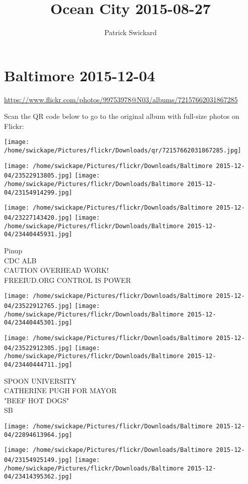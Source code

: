 \documentclass[10pt,letterpaper]{article}
\title{Ocean City 2015-08-27}
\author{Patrick Swickard}
\date{}
\begin{document}
\section*{Baltimore 2015-12-04}

\url{https://www.flickr.com/photos/99753978@N03/albums/72157662031867285}

Scan the QR code below to go to the original album with full-size photos on Flickr:

\texttt{[image: /home/swickape/Pictures/flickr/Downloads/qr/72157662031867285.jpg]}
\pagebreak

\texttt{[image: /home/swickape/Pictures/flickr/Downloads/Baltimore 2015-12-04/23522913805.jpg]}
\texttt{[image: /home/swickape/Pictures/flickr/Downloads/Baltimore 2015-12-04/23154914299.jpg]}

\texttt{[image: /home/swickape/Pictures/flickr/Downloads/Baltimore 2015-12-04/23227143420.jpg]}
\texttt{[image: /home/swickape/Pictures/flickr/Downloads/Baltimore 2015-12-04/23440445931.jpg]}

Pinup\\
CDC ALB\\
CAUTION OVERHEAD WORK!\\
FREEIUD.ORG CONTROL IS POWER
\pagebreak

\texttt{[image: /home/swickape/Pictures/flickr/Downloads/Baltimore 2015-12-04/23522912765.jpg]}
\texttt{[image: /home/swickape/Pictures/flickr/Downloads/Baltimore 2015-12-04/23440445301.jpg]}

\texttt{[image: /home/swickape/Pictures/flickr/Downloads/Baltimore 2015-12-04/23522912305.jpg]}
\texttt{[image: /home/swickape/Pictures/flickr/Downloads/Baltimore 2015-12-04/23440444711.jpg]}

SPOON UNIVERSITY\\
CATHERINE PUGH FOR MAYOR\\
"BEEF HOT DOGS"\\
SB
\pagebreak

\texttt{[image: /home/swickape/Pictures/flickr/Downloads/Baltimore 2015-12-04/22894613964.jpg]}

\vspace{0.25in}
\texttt{[image: /home/swickape/Pictures/flickr/Downloads/Baltimore 2015-12-04/23154925149.jpg]}
\texttt{[image: /home/swickape/Pictures/flickr/Downloads/Baltimore 2015-12-04/23414395362.jpg]}
\end{document}
